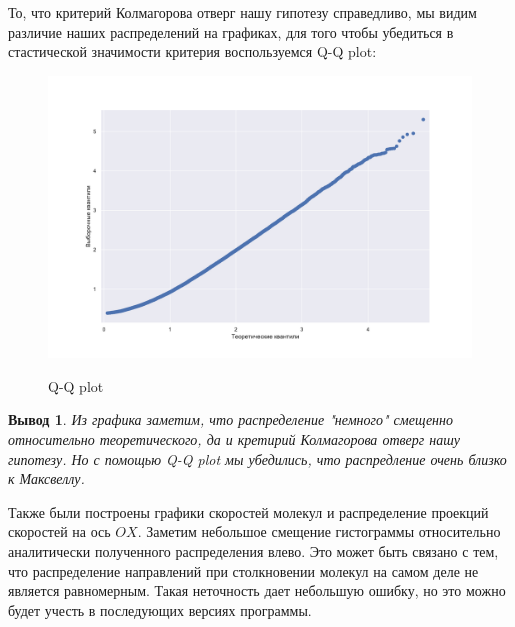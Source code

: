 \documentclass[twoside,twocolumn, 11pt]{article}
\theoremstyle{plain}
\newtheorem{conclusion}{Вывод}
\theoremstyle{definition}
\begin{document}
\indent То, что критерий Колмагорова отверг нашу гипотезу справедливо, мы видим различие наших распределений на графиках,
для того чтобы убедиться в стастической значимости критерия воспользуемся Q-Q plot:
\begin{figure}[!h]
{\includegraphics[width=1\linewidth]{qqplot}}
\caption{Q-Q plot}
\end{figure}


\begin{conclusion}
Из графика заметим, что распределение "немного" смещенно относительно теоретического, да и кретирий Колмагорова отверг нашу гипотезу.
Но с помощью Q-Q plot мы убедились, что распредление очень близко к Максвеллу.
\end{conclusion}

Также были построены графики скоростей молекул и распределение проекций скоростей на ось $OX$. Заметим небольшое смещение гистограммы относительно аналитически полученного распределения влево. Это может быть связано с тем, что распределение направлений при столкновении молекул на самом деле не является равномерным. Такая неточность дает небольшую ошибку, но это можно будет учесть в последующих версиях программы.
\end{document}
